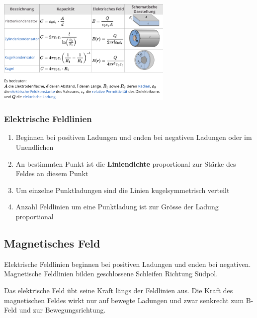 \documentclass[7pt]{article}
\begin{document}
\begin{multicols*}{3}
\includegraphics[width=240pt]{images/mf/capacitor_formulas}

\subsubsection{Elektrische Feldlinien}

\begin{enumerate}
	\item Beginnen bei positiven Ladungen und enden bei negativen Ladungen oder im Unendlichen
	\item An bestimmten Punkt ist die \textbf{Liniendichte} proportional zur St{\"a}rke des Feldes an diesem Punkt
	\item Um einzelne Punktladungen sind die Linien kugelsymmetrisch verteilt
	\item Anzahl Feldlinien um eine Punktladung ist zur Gr{\"o}sse der Ladung proportional
\end{enumerate}

\subsection{Magnetisches Feld}

\begin{description}[labelindent=16pt,style=multiline,leftmargin=2.5cm, noitemsep]
	\item[Richtung:] Elektrische Feldlinien beginnen bei positiven Ladungen und enden bei negativen.\newline
		Magnetische Feldlinien bilden geschlossene Schleifen Richtung S{\"u}dpol.
	\item[Kraft:] Das elektrische Feld {\"u}bt seine Kraft l{\"a}ngs der Feldlinien aus. \newline
				 Die Kraft des magnetischen Feldes wirkt nur auf bewegte Ladungen und zwar senkrecht zum B-Feld und zur Bewegungsrichtung.
\end{description}


\end{multicols*}
\end{document}
